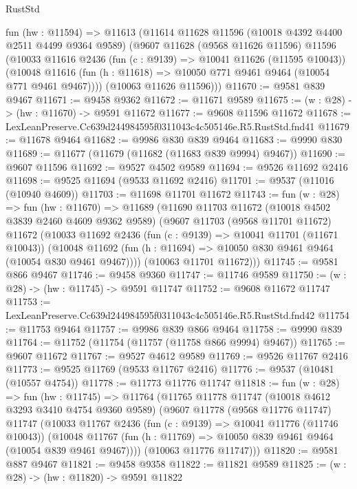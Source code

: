 \begin{lexlean}{RustStd}
\begin{coremodule}
  fun (hw : @11594) =>
  @11613
    (@11614
      @11628
      @11596
      (@10018 @4392 @4400 @2511 @4499 @9364 @9589)
      (@9607
        @11628
        (@9568 @11626 @11596)
        @11596
        (@10033
          @11616
          @2436
          (fun (c : @9139) => @10041 @11626 (@11595 @10043))
          (@10048 @11616 (fun (h : @11618) => @10050 @771 @9461 @9464 (@10054 @771 @9461 @9467))))
        (@10063 @11626 @11596)))
@11670 := @9581 @839 @9467
@11671 := @9458 @9362
@11672 := @11671 @9589
@11675 := (w : @28) -> (hw : @11670) -> @9591 @11672
@11677 := @9608 @11596 @11672
@11678 := LexLeanPreserve.Cc639d244984595f0311043c4c505146e.R5.RustStd.fnd41
@11679 := @11678 @9464
@11682 := @9986 @830 @839 @9464
@11683 := @9990 @830
@11689 := @11677 (@11679 (@11682 (@11683 @839 @9994) @9467))
@11690 := @9607 @11596
@11692 := @9527 @4502 @9589
@11694 := @9526 @11692 @2416
@11698 := @9525 @11694 (@9533 @11692 @2416)
@11701 := @9537 (@11016 (@10940 @4609))
@11703 := @11698 @11701 @11672
@11743 := fun (w : @28) =>
  fun (hw : @11670) =>
  @11689
    (@11690
      @11703
      @11672
      (@10018 @4502 @3839 @2460 @4609 @9362 @9589)
      (@9607
        @11703
        (@9568 @11701 @11672)
        @11672
        (@10033
          @11692
          @2436
          (fun (c : @9139) => @10041 @11701 (@11671 @10043))
          (@10048 @11692 (fun (h : @11694) => @10050 @830 @9461 @9464 (@10054 @830 @9461 @9467))))
        (@10063 @11701 @11672)))
@11745 := @9581 @866 @9467
@11746 := @9458 @9360
@11747 := @11746 @9589
@11750 := (w : @28) -> (hw : @11745) -> @9591 @11747
@11752 := @9608 @11672 @11747
@11753 := LexLeanPreserve.Cc639d244984595f0311043c4c505146e.R5.RustStd.fnd42
@11754 := @11753 @9464
@11757 := @9986 @839 @866 @9464
@11758 := @9990 @839
@11764 := @11752 (@11754 (@11757 (@11758 @866 @9994) @9467))
@11765 := @9607 @11672
@11767 := @9527 @4612 @9589
@11769 := @9526 @11767 @2416
@11773 := @9525 @11769 (@9533 @11767 @2416)
@11776 := @9537 (@10481 (@10557 @4754))
@11778 := @11773 @11776 @11747
@11818 := fun (w : @28) =>
  fun (hw : @11745) =>
  @11764
    (@11765
      @11778
      @11747
      (@10018 @4612 @3293 @3410 @4754 @9360 @9589)
      (@9607
        @11778
        (@9568 @11776 @11747)
        @11747
        (@10033
          @11767
          @2436
          (fun (c : @9139) => @10041 @11776 (@11746 @10043))
          (@10048 @11767 (fun (h : @11769) => @10050 @839 @9461 @9464 (@10054 @839 @9461 @9467))))
        (@10063 @11776 @11747)))
@11820 := @9581 @887 @9467
@11821 := @9458 @9358
@11822 := @11821 @9589
@11825 := (w : @28) -> (hw : @11820) -> @9591 @11822

\end{coremodule}
\end{lexlean}
